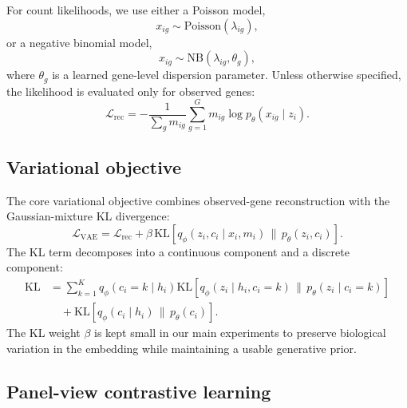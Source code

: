 For count likelihoods, we use either a Poisson model,
\begin{equation}
    x_{ig} \sim \mathrm{Poisson}(\lambda_{ig}),
\end{equation}
or a negative binomial model,
\begin{equation}
    x_{ig} \sim \mathrm{NB}(\lambda_{ig}, \theta_g),
\end{equation}
where \(\theta_g\) is a learned gene-level dispersion parameter. Unless otherwise
specified, the likelihood is evaluated only for observed genes:
\begin{equation}
    \mathcal{L}_{\mathrm{rec}}
    =
    - \frac{1}{\sum_g m_{ig}}
      \sum_{g=1}^{G} m_{ig}
      \log p_{\theta}(x_{ig} \mid z_i).
\end{equation}

\subsection{Variational objective}

The core variational objective combines observed-gene reconstruction with the
Gaussian-mixture KL divergence:
\begin{equation}
    \mathcal{L}_{\mathrm{VAE}}
    =
    \mathcal{L}_{\mathrm{rec}}
    +
    \beta\,
    \mathrm{KL}\left[
        q_{\phi}(z_i,c_i \mid x_i,m_i)
        \,\|\, p_{\theta}(z_i,c_i)
    \right].
\end{equation}
The KL term decomposes into a continuous component and a discrete component:
\begin{align}
    \mathrm{KL}
    &=
    \sum_{k=1}^{K} q_{\phi}(c_i=k \mid h_i)
    \mathrm{KL}\left[
        q_{\phi}(z_i \mid h_i,c_i=k)
        \,\|\, p_{\theta}(z_i \mid c_i=k)
    \right] \nonumber \\
    &\quad+
    \mathrm{KL}\left[
        q_{\phi}(c_i \mid h_i)
        \,\|\, p_{\theta}(c_i)
    \right].
\end{align}
The KL weight \(\beta\) is kept small in our main experiments to preserve biological
variation in the embedding while maintaining a usable generative prior.

\subsection{Panel-view contrastive learning}


